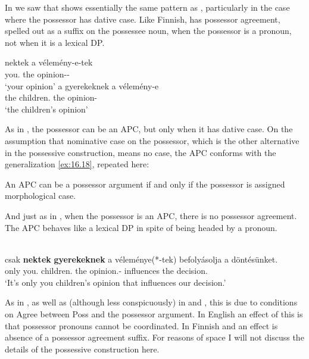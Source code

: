 \documentclass[output=paper]{langsci/langscibook}
\begin{document}
In  we saw that  shows essentially the same
pattern as , particularly in the case where the possessor has
dative case. Like Finnish,  has possessor
agreement, spelled out as a suffix on the possessee noun, when the possessor is
a pronoun, not when it is a lexical DP.

\ea\label{ex:16.46}
   	\ea
		\gll nektek    a    vélemény-e-tek\\
		        you.\Dat{} the opinion-\Poss-\Spl{}\\
	    \glt `your opinion'
	\ex
		\gll a    gyerekeknek    a    vélemény-e\\
			the children.\Dat{} the opinion-\Poss{}\\
		\glt `the children's opinion'
	\z
\z

As in , the possessor can be an \gls{APC}, but only when it has dative case.  On the
assumption that nominative case on the possessor, which is
the other alternative in the  possessive construction, means no
case,  the  \gls{APC}
conforms with the generalization \eqref{ex:16.18}, repeated here:

\ea\label{ex:16.47}
    An \gls{APC} can be a possessor argument if and only if the possessor is assigned
    morphological case.
\z

And just as in , when the possessor is an \gls{APC}, there is no possessor agreement. The
\gls{APC} behaves like a lexical DP in spite
of being headed by a pronoun.

\ea\label{ex:16.48}\\
    \gll   {}csak \textbf{nektek} \textbf{gyerekeknek} a véleménye(*-tek) befolyásolja a döntésünket.\\
            only you.\Dat{} children.\Dat{} the opinion.\Poss{}-\Spl{} influences the decision.\Acc{}\\
    \glt    `It's only you children's opinion that influences our decision.'
\z

As in , as well as (although less conspicuously) in  and ,
this is due to conditions on Agree between Poss and the possessor argument. In
English an effect of this is that possessor pronouns cannot be coordinated. In
Finnish and  an effect is absence of a possessor agreement suffix. For
reasons of space I will not discuss the details of the  possessive
construction here.
\end{document}
